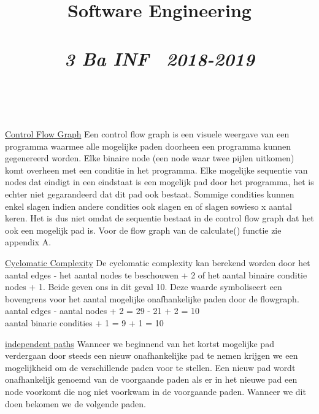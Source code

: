 \documentclass{article}
\title{\textmd{\textbf{Software Engineering}}\\\normalsize\vspace{0.1in}\Large{\assignmentname}\\\vspace{0.1in}\small{\textit{3 Ba INF \  2018-2019}}}
\author{\studentA \\ \studentB}
\begin{document}
\maketitle
\noindent
\underline{Control Flow Graph}\newline
\newline
Een control flow graph is een visuele weergave van een programma waarmee alle mogelijke paden doorheen een programma kunnen gegenereerd worden. Elke binaire node (een node waar twee pijlen uitkomen) komt overheen met een conditie in het programma. Elke mogelijke sequentie van nodes dat eindigt in een eindstaat is een mogelijk pad door het programma, het is echter niet gegarandeerd dat dit pad ook bestaat. Sommige condities kunnen enkel slagen indien andere condities ook slagen en of slagen sowieso x aantal keren. Het is dus niet omdat de sequentie bestaat in de control flow graph dat het ook een mogelijk pad is. Voor de flow graph van de calculate() functie zie appendix A. \\
\newline
\maketitle
\noindent
\underline{Cyclomatic Complexity}\newline
\newline
De cyclomatic complexity kan berekend worden door het aantal edges - het aantal nodes te beschouwen + 2 of het aantal binaire conditie nodes + 1. Beide geven ons in dit geval 10. Deze waarde symboliseert een bovengrens voor het aantal mogelijke onafhankelijke paden door de flowgraph. \\
aantal edges - aantal nodes + 2 = 29 - 21 + 2 = 10 \\
aantal binarie condities + 1 = 9 + 1 = 10 \\

\newpage
\maketitle
\noindent
\underline{independent paths}\newline
\newline
Wanneer we beginnend van het kortst mogelijke pad verdergaan door steeds een nieuw onafhankelijke pad te nemen krijgen we een mogelijkheid om de verschillende paden voor te stellen. Een nieuw pad wordt onafhankelijk genoemd van de voorgaande paden als er in het nieuwe pad een node voorkomt die nog niet voorkwam in de voorgaande paden. Wanneer we dit doen bekomen we de volgende paden. \\
\end{document}
